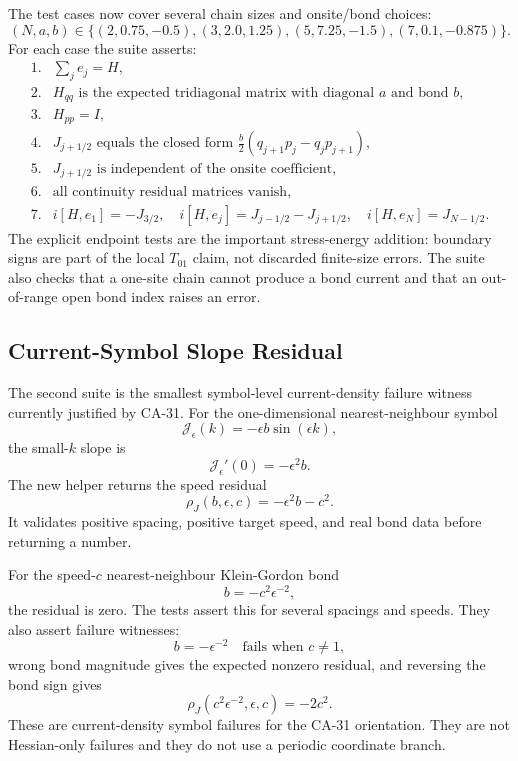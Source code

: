 The test cases now cover several chain sizes and onsite/bond choices:
\[
  (N,a,b)\in
  \{(2,0.75,-0.5),(3,2.0,1.25),(5,7.25,-1.5),(7,0.1,-0.875)\}.
\]
For each case the suite asserts:
\[
\begin{array}{ll}
1.&\sum_j e_j=H,\\
2.&H_{qq}\text{ is the expected tridiagonal matrix with diagonal }a
    \text{ and bond }b,\\
3.&H_{pp}=I,\\
4.&J_{j+1/2}\text{ equals the closed form }
    \frac b2(q_{j+1}p_j-q_jp_{j+1}),\\
5.&J_{j+1/2}\text{ is independent of the onsite coefficient},\\
6.&\text{all continuity residual matrices vanish},\\
7.&i[H,e_1]=-J_{3/2},\quad
   i[H,e_j]=J_{j-1/2}-J_{j+1/2},\quad
   i[H,e_N]=J_{N-1/2}.
\end{array}
\]
The explicit endpoint tests are the important stress-energy addition: boundary
signs are part of the local \(T_{01}\) claim, not discarded finite-size errors.
The suite also checks that a one-site chain cannot produce a bond current and
that an out-of-range open bond index raises an error.

\subsection{Current-Symbol Slope Residual}

The second suite is the smallest symbol-level current-density failure witness
currently justified by CA-31.  For the one-dimensional nearest-neighbour symbol
\[
  \mathcal J_\epsilon(k)=-\epsilon b\sin(\epsilon k),
\]
the small-\(k\) slope is
\[
  \mathcal J_\epsilon'(0)=-\epsilon^2 b.
\]
The new helper returns the speed residual
\[
  \rho_J(b,\epsilon,c)=-\epsilon^2 b-c^2 .
\]
It validates positive spacing, positive target speed, and real bond data before
returning a number.

For the speed-\(c\) nearest-neighbour Klein-Gordon bond
\[
  b=-c^2\epsilon^{-2},
\]
the residual is zero.  The tests assert this for several spacings and speeds.
They also assert failure witnesses:
\[
  b=-\epsilon^{-2}\quad\text{fails when }c\ne1,
\]
wrong bond magnitude gives the expected nonzero residual, and reversing the
bond sign gives
\[
  \rho_J(c^2\epsilon^{-2},\epsilon,c)=-2c^2 .
\]
These are current-density symbol failures for the CA-31 orientation.  They are
not Hessian-only failures and they do not use a periodic coordinate branch.

